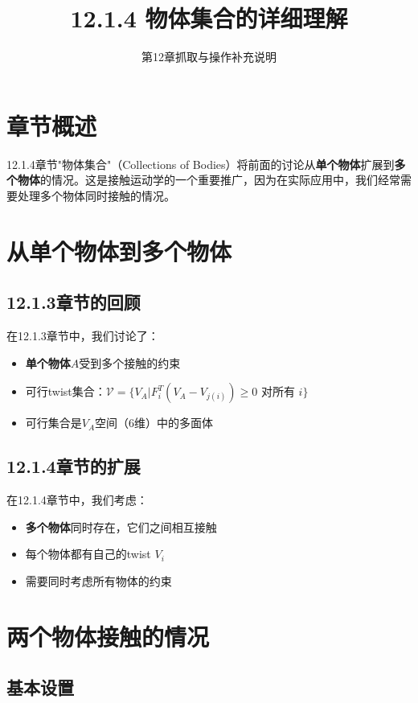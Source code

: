 \documentclass[12pt,a4paper]{article}
\title{12.1.4 物体集合的详细理解}
\author{第12章抓取与操作补充说明}
\date{}
\begin{document}
\maketitle

\section{章节概述}

12.1.4章节"物体集合"（Collections of Bodies）将前面的讨论从\textbf{单个物体}扩展到\textbf{多个物体}的情况。这是接触运动学的一个重要推广，因为在实际应用中，我们经常需要处理多个物体同时接触的情况。

\section{从单个物体到多个物体}

\subsection{12.1.3章节的回顾}

在12.1.3章节中，我们讨论了：
\begin{itemize}
\item \textbf{单个物体}$A$受到多个接触的约束
\item 可行twist集合：$\mathcal{V} = \{V_A | F_i^T (V_A - V_{j(i)}) \geq 0 \text{ 对所有 } i\}$
\item 可行集合是$V_A$空间（6维）中的多面体
\end{itemize}

\subsection{12.1.4章节的扩展}

在12.1.4章节中，我们考虑：
\begin{itemize}
\item \textbf{多个物体}同时存在，它们之间相互接触
\item 每个物体都有自己的twist $V_i$
\item 需要同时考虑所有物体的约束
\end{itemize}

\section{两个物体接触的情况}

\subsection{基本设置}
\end{document}

